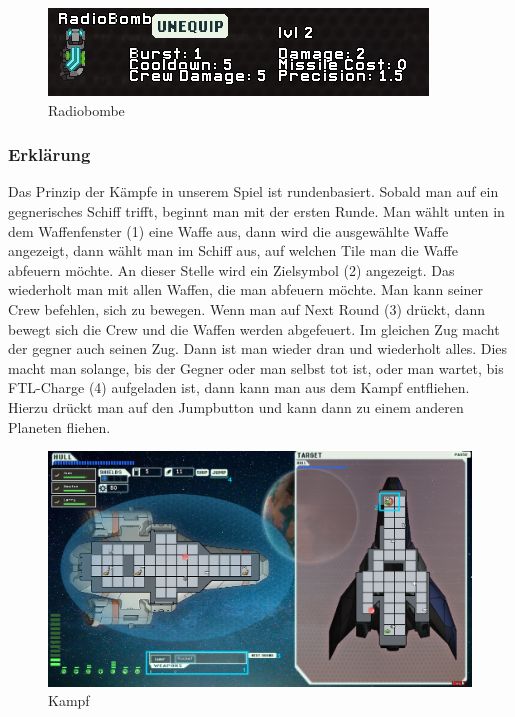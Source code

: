 \documentclass[fontsize=12pt,paper=a4,twoside]{scrartcl}
\begin{document}
\begin{figure}[H]
\centering
\includegraphics[width=1\linewidth]{DasSpiel/Kampf/waffen/radiobo.png}
\caption{Radiobombe}
\end{figure}

\subsubsection{Erklärung}
\label{sec:Erklärung}

Das Prinzip der Kämpfe in unserem Spiel ist rundenbasiert. Sobald man auf ein gegnerisches Schiff trifft, beginnt man mit der ersten Runde. Man wählt unten in dem Waffenfenster (1) eine Waffe aus, dann wird die ausgewählte Waffe angezeigt, dann wählt man im Schiff aus, auf welchen Tile man die Waffe abfeuern möchte. An dieser Stelle wird ein Zielsymbol (2) angezeigt. Das wiederholt man mit allen Waffen, die man abfeuern möchte. Man kann seiner Crew befehlen, sich zu bewegen. Wenn man auf Next Round (3) drückt, dann bewegt sich die Crew und die Waffen werden abgefeuert. Im gleichen Zug macht der gegner auch seinen Zug. Dann ist man wieder dran und wiederholt alles. Dies macht man solange, bis der Gegner oder man selbst tot ist, oder man wartet, bis FTL-Charge (4) aufgeladen ist, dann kann man aus dem Kampf entfliehen. Hierzu drückt man auf den Jumpbutton und kann dann zu einem anderen Planeten fliehen. 

\begin{figure}[H]
\centering
\includegraphics[width=1\linewidth]{DasSpiel/Kampf/fight.png}
\caption{Kampf}
\end{figure}
\end{document}
